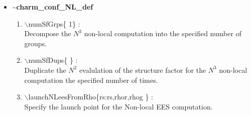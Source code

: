 \documentclass[12pt]{article}
\begin{document}
\begin{itemize}
\clearpage
\huge
\item[] {\bf \~{ }charm\_conf\_NL\_def}
\begin{enumerate}
  \vspace{0.15in} \Large
  \item $\backslash$numSfGrps\{ 1\} : \\    \large
  Decompose the $N^3$ non-local computation into the specified number of groups.
  \vspace{0.15in} \Large
  \item $\backslash$numSfDups\{ \} : \\    \large
  Duplicate the $N^2$ evalulation of the structure factor for the
  $N^3$ non-local computation the specified number of times.
  \vspace{0.15in} \Large
  \item $\backslash$launchNLeesFromRho\{rs:rs,rhor,rhog \} : \\  \large
  Specify the launch point for the Non-local EES computation.
\end{enumerate}


\end{itemize}
\end{document}
